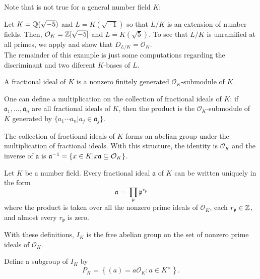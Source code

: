 Note that  is not true for a general number field $K$:

\begin{example}
    Let $K = \mathbb{Q}(\sqrt{-5})$ and $L = K(\sqrt{-1})$ so that $L/K$ is an extension of number fields. Then, $\mathcal{O}_{K} = \mathbb{Z}[\sqrt{-5}]$ and $L = K(\sqrt{5})$. To see that $L/K$ is unramified at all primes, we apply  and show that $D_{L/K} = \mathcal{O}_{K}$.\\

    The remainder of this example is just some computations regarding the discriminant and two diferent $K$-bases of $L$.
\end{example}

\begin{definition}
    A fractional ideal of $K$ is a nonzero finitely generated $\mathcal{O}_{K}$-submodule of $K$.
\end{definition}

One can define a multiplication on the collection of fractional ideals of $K$: if $\mathfrak{a}_1, \ldots, \mathfrak{a}_n$ are all fractional ideals of $K$, then the product is the $\mathcal{O}_{K}$-submodule of $K$ generated by $\{a_1\cdots a_n | a_j \in \mathfrak{a}_j\}$.

\begin{proposition}
    The collection of fractional ideals of $K$ forms an abelian group under the multiplication of fractional ideals.
    With this structure, the identity is $\mathcal{O}_{K}$ and the inverse of $\mathfrak{a}$ is $\mathfrak{a}^{-1} = \{x \in K| x \mathfrak{a} \subseteq \mathcal{O}_{K}\}$.
\end{proposition}

\begin{proposition}
    Let $K$ be a number field. Every fractional ideal $\mathfrak{a}$ of $K$ can be written uniquely in the form 
        \[\mathfrak{a} = \prod_{\mathfrak{p}} \mathfrak{p}^{r_\mathfrak{p}}\]
    where the product is taken over all the nonzero prime ideals of $\mathcal{O}_{K}$, each $r_\mathfrak{p} \in \mathbb{Z}$, and almost every $r_\mathfrak{p}$ is zero.
\end{proposition}

With these definitions, $I_K$ is the free abelian group on the set of nonzero prime ideals of $\mathcal{O}_{K}$.

Define a subgroup of $I_K$ by
    \[P_K = \left\{ (a) = a \mathcal{O}_{K}: a \in K^\times \right\}.\]

